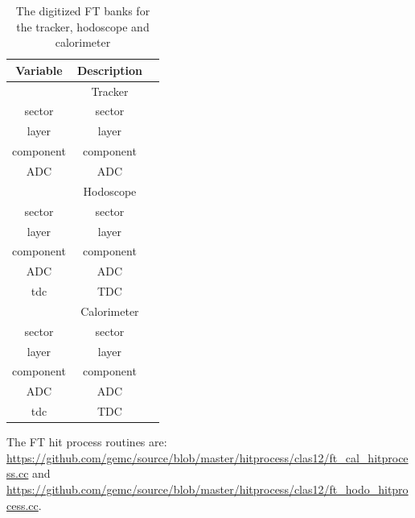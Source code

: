 \begin{table}[h]
	\begin{center}
		\begin{tabular}{| c | c | c |}
			\hline \hline
			Variable         & Description    \\
			\hline
		            & Tracker  &   \\
			\hline
                       sector  &     sector     \\
                        layer  &      layer     \\
                    component  &  component     \\
                          ADC  &        ADC     \\
			\hline
		          & Hodoscope  &   \\
			\hline
					   sector  &     sector     \\
                        layer  &      layer     \\
                    component  &  component     \\
                          ADC  &        ADC     \\
                          tdc  &        TDC     \\
			\hline
				  & Calorimeter  &   \\
			\hline
				         sector  &     sector      \\
				   	      layer  &      layer      \\
					  component  &  component      \\
							ADC  &        ADC      \\
							tdc  &        TDC      \\
			\hline \hline
		\end{tabular}
	\end{center}
	\caption{The digitized FT banks for the tracker, hodoscope and calorimeter}\label{tab:ftBank}
\end{table}

The FT hit process routines are: \url{https://github.com/gemc/source/blob/master/hitprocess/clas12/ft_cal_hitprocess.cc} and
\url{https://github.com/gemc/source/blob/master/hitprocess/clas12/ft_hodo_hitprocess.cc}.
